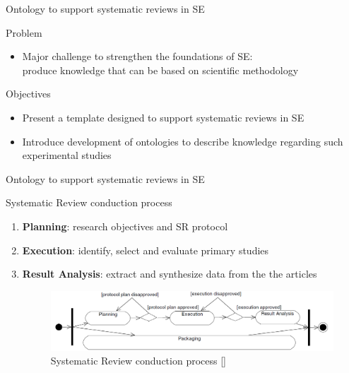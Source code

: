 \documentclass[16:9,en,navbarside]{sdqbeamer}
\begin{document}
\begin{frame}{Ontology to support systematic reviews in SE}
\begin{alertblock}{Problem}
\begin{itemize}
    \item Major challenge to strengthen the foundations of SE: \\produce knowledge that can be based on scientific methodology
\end{itemize}
\end{alertblock}
\pause
\begin{block}{Objectives}
    \begin{itemize}
		\item Present a template designed to support systematic reviews in SE
		\pause
		\item Introduce development of ontologies to describe knowledge regarding such experimental studies 
    \end{itemize}
\end{block}
\end{frame}

\begin{frame}{Ontology to support systematic reviews in SE}
\begin{exampleblock}{Systematic Review conduction process}
\begin{enumerate}
    \item<1> \textbf{Planning}: research objectives and SR protocol
    \item<2> \textbf{Execution}: identify, select and evaluate primary studies
    \item<3> \textbf{Result Analysis}: extract and synthesize data from the the articles
    \begin{figure}
	    \includegraphics[width=11cm]{images/SRProcess.PNG}
	    \caption{Systematic Review conduction process [\cite{Bio07}]}
    \end{figure}
\end{enumerate}
\end{exampleblock}
\end{frame}
\end{document}
